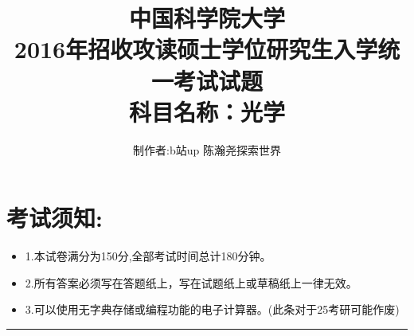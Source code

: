 \documentclass[11pt,a4paper]{article}
\begin{document}
    \title{中国科学院大学\\2016年招收攻读硕士学位研究生入学统一考试试题\\科目名称：光学}
    \author{制作者:b站up 陈瀚尧探索世界}
    \date{}
    \maketitle
    \titleformat{\section}[block]{\normalfont\Large\bfseries}{}{0pt}{}


    \section{考试须知:}
    \begin{itemize}[topsep=0pt,itemsep=0pt,partopsep=0pt]
        \item 1.本试卷满分为150分,全部考试时间总计180分钟。
        \vspace{-3mm}
        \item 2.所有答案必须写在答题纸上，写在试题纸上或草稿纸上一律无效。
        \vspace{-3mm}
        \item 3.可以使用无字典存储或编程功能的电子计算器。(此条对于25考研可能作废)
    \end{itemize}
    \vspace{-5mm}
    \noindent\rule{\textwidth}{0.5pt} %
    \vspace{-12mm}
\end{document}
